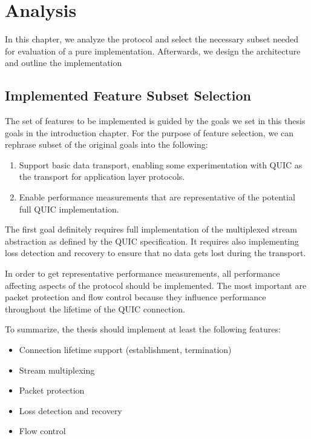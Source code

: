 \chapter{Analysis}\label{chap:03-analysis}

In this chapter, we analyze the protocol and select the necessary subset needed for evaluation of a
pure \dotnet{} implementation. Afterwards, we design the architecture and outline the implementation

\section{Implemented Feature Subset Selection}

The set of features to be implemented is guided by the goals we set in this thesis goals in the
introduction chapter. For the purpose of feature selection, we can rephrase subset of the original
goals into the following:


\begin{enumerate}

  \item Support basic data transport, enabling some experimentation with QUIC as the transport for
    application layer protocols.

  \item Enable performance measurements that are representative of the potential full QUIC
    implementation.

\end{enumerate}

The first goal definitely requires full implementation of the multiplexed stream abstraction as
defined by the QUIC specification. It requires also implementing loss detection and recovery to
ensure that no data gets lost during the transport.

In order to get representative performance measurements, all performance affecting aspects of the
protocol should be implemented. The most important are packet protection and flow control because
they influence performance throughout the lifetime of the QUIC connection.

To summarize, the thesis should implement at least the following features:

\begin{itemize}

    \item Connection lifetime support (establishment, termination)

    \item Stream multiplexing

    \item Packet protection

    \item Loss detection and recovery

    \item Flow control

\end{itemize}

